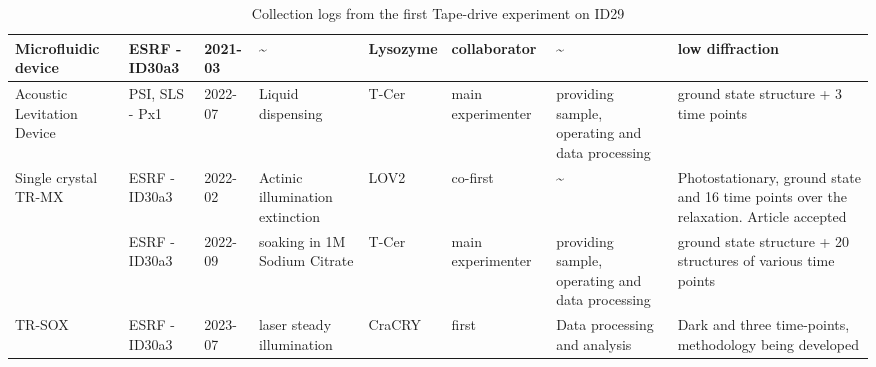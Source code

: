 \begin{table}[H]
{\begin{tabular}{| m{2.5cm} |  m{1.5cm} | m{1.5cm} | m{2cm} | m{1.5cm} | m{2.5cm} | m{2.5cm} | m{3.5cm} |}
        \hline 
        Microfluidic device & ESRF - ID30a3 & 2021-03 & \textasciitilde & Lysozyme & collaborator & \textasciitilde & low diffraction \\ 
        \hline 
        Acoustic Levitation Device & PSI, SLS - Px1 & 2022-07 & Liquid dispensing & T-Cer & main experimenter & providing sample, operating and data processing & ground state structure + 3 time points \\ 
        \hline 
        Single crystal TR-MX & ESRF - ID30a3 & 2022-02 & Actinic illumination extinction & LOV2  & co-first & \textasciitilde & Photostationary, ground state and 16 time points over the relaxation. Article accepted \\ 
        \cline{2-8} 
         & ESRF - ID30a3 & 2022-09 & soaking in 1M Sodium Citrate & T-Cer & main experimenter & providing sample, operating and data processing & ground state structure + 20 structures of various time points \\ 
        \hline
        TR-SOX & ESRF - ID30a3 & 2023-07 & laser steady illumination & CraCRY  & first & Data processing and analysis & Dark and three time-points, methodology being developed \\ 
        \hline
    \end{tabular}}
    \caption{Collection logs from the first Tape-drive experiment on ID29}
    \label{tab:all_TR-MX}
\end{table}
